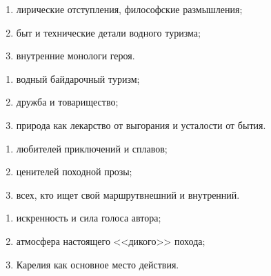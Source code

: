 {
\begin{enumerate}[leftmargin=1cm, itemsep=0pt, topsep=0pt] %
	\item[--] лирические отступления, философские размышления;
	\item[--] быт и технические детали водного туризма;
	\item[--] внутренние монологи героя.
\end{enumerate}

\begin{enumerate}[leftmargin=1cm, itemsep=0pt, topsep=0pt]
	\item[--] водный байдарочный туризм;	
	\item[--] дружба и товарищество;	
	\item[--] природа как лекарство от выгорания и усталости от бытия.
\end{enumerate}

\begin{enumerate}[leftmargin=1cm, itemsep=0pt, topsep=0pt]
	\item[--] любителей приключений и сплавов;
	\item[--] ценителей походной прозы; %
	\item[--] всех, кто ищет свой маршрут\mdash внешний и внутренний.	
\end{enumerate}

\begin{enumerate}[leftmargin=1cm, itemsep=0pt, topsep=0pt]
	\item[--] искренность и сила голоса автора;
	\item[--] атмосфера настоящего <<дикого>> похода;
	\item[--] Карелия как основное место действия.
\end{enumerate}


%
%

}

